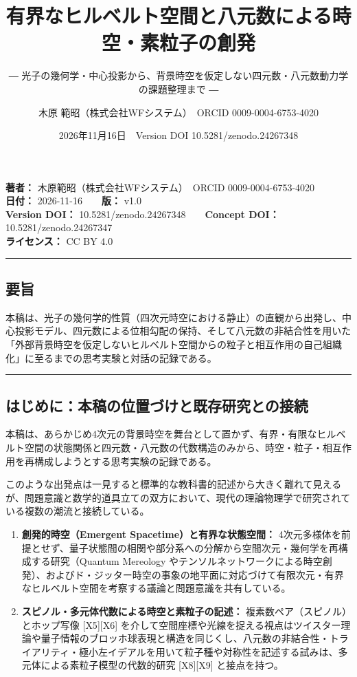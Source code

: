 \documentclass[
  a4paper,
]{ltjsarticle}
\title{有界なヒルベルト空間と八元数による時空・素粒子の創発}
\subtitle{―
光子の幾何学・中心投影から、背景時空を仮定しない四元数・八元数動力学の課題整理まで
―}
\author{木原 範昭（株式会社WFシステム）　ORCID 0009-0004-6753-4020}
\date{2026年11月16日　Version DOI 10.5281/zenodo.24267348}
\providecommand{\tightlist}{%
  \setlength{\itemsep}{0pt}\setlength{\parskip}{0pt}}
\begin{document}
\maketitle

\textbf{著者：} 木原範昭（株式会社WFシステム）　ORCID
0009-0004-6753-4020\\
\textbf{日付：} 2026-11-16　　\textbf{版：} v1.0\\
\textbf{Version DOI：} 10.5281/zenodo.24267348　　\textbf{Concept DOI：}
10.5281/zenodo.24267347\\
\textbf{ライセンス：} CC BY 4.0

\begin{center}\rule{0.5\linewidth}{0.5pt}\end{center}

\subsection{要旨}\label{ux8981ux65e8}

本稿は、光子の幾何学的性質（四次元時空における静止）の直観から出発し、中心投影モデル、四元数による位相勾配の保持、そして八元数の非結合性を用いた「外部背景時空を仮定しないヒルベルト空間からの粒子と相互作用の自己組織化」に至るまでの思考実験と対話の記録である。

\begin{center}\rule{0.5\linewidth}{0.5pt}\end{center}

\subsection{はじめに：本稿の位置づけと既存研究との接続}\label{ux306fux3058ux3081ux306bux672cux7a3fux306eux4f4dux7f6eux3065ux3051ux3068ux65e2ux5b58ux7814ux7a76ux3068ux306eux63a5ux7d9a}

本稿は、あらかじめ4次元の背景時空を舞台として置かず、有界・有限なヒルベルト空間の状態関係と四元数・八元数の代数構造のみから、時空・粒子・相互作用を再構成しようとする思考実験の記録である。

このような出発点は一見すると標準的な教科書的記述から大きく離れて見えるが、問題意識と数学的道具立ての双方において、現代の理論物理学で研究されている複数の潮流と接続している。

\begin{enumerate}
\def\labelenumi{\arabic{enumi}.}
\tightlist
\item
  \textbf{創発的時空（Emergent Spacetime）と有界な状態空間：}
  4次元多様体を前提とせず、量子状態間の相関や部分系への分解から空間次元・幾何学を再構成する研究（Quantum
  Mereology
  やテンソルネットワークによる時空創発）、およびド・ジッター時空の事象の地平面に対応づけて有限次元・有界なヒルベルト空間を考察する議論と問題意識を共有している。
\item
  \textbf{スピノル・多元体代数による時空と素粒子の記述：}
  複素数ペア（スピノル）とホップ写像 {[}X5{]}{[}X6{]}
  を介して空間座標や光線を捉える視点はツイスター理論や量子情報のブロッホ球表現と構造を同じくし、八元数の非結合性・トライアリティ・極小左イデアルを用いて粒子種や対称性を記述する試みは、多元体による素粒子模型の代数的研究
  {[}X8{]}{[}X9{]} と接点を持つ。
\end{enumerate}
\end{document}

